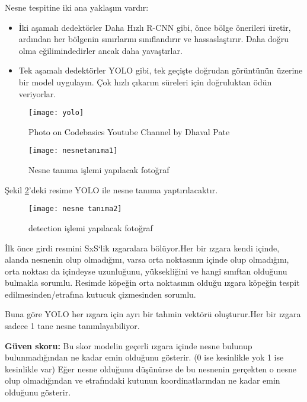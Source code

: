 \documentclass[11pt,a4paper]{report}
\begin{document}
\begin{justify}
   	Nesne tespitine iki ana yaklaşım vardır:
   	\begin{itemize}
   		\item  İki aşamalı dedektörler Daha Hızlı R-CNN gibi, önce bölge önerileri üretir, ardından her bölgenin sınırlarını sınıflandırır ve hassaslaştırır. Daha doğru olma eğilimindedirler ancak daha yavaştırlar.
   		\item  Tek aşamalı dedektörler YOLO gibi, tek geçişte doğrudan görüntünün üzerine bir model uygulayın. Çok hızlı çıkarım süreleri için doğruluktan ödün veriyorlar.
   	\end{itemize}
   	
   	\begin{figure}[!h]
   		\centering
   		\texttt{[image: yolo]}
   		\caption{Photo on Codebasics Youtube Channel by Dhaval Pate}
   		\label{fig:ornek2}
   	\end{figure}
   
   	
   	\begin{figure}[!h]
   		\centering
   		\texttt{[image: nesnetanıma1]}
   		\caption{Nesne tanıma işlemi yapılacak fotoğraf}
   		\label{fig:ornek3}
   	\end{figure}
   	
   	Şekil \ref{fig:ornek3}'deki resime YOLO ile nesne tanıma yaptırılacaktır. 
   	
   	
   	\begin{figure}[!h]
   		\centering
   		\texttt{[image: nesne tanıma2]}
   		\label{ornek4}
   		\caption{detection işlemi yapılacak fotoğraf}
   	\end{figure}
   	\newpage
   	İlk önce girdi resmini SxS‘lik ızgaralara bölüyor.Her bir ızgara kendi içinde, alanda nesnenin olup olmadığını, varsa orta noktasının içinde olup olmadığını, orta noktası da içindeyse uzunluğunu, yüksekliğini ve hangi sınıftan olduğunu bulmakla sorumlu. Resimde köpeğin orta noktasının olduğu ızgara köpeğin tespit edilmesinden/etrafına kutucuk çizmesinden sorumlu.
   	\newline
   	
   	Buna göre YOLO her ızgara için ayrı bir tahmin vektörü oluşturur.Her bir ızgara sadece 1 tane nesne tanımlayabiliyor. \newline
   	
   	\textbf{Güven skoru:} Bu skor modelin geçerli ızgara içinde nesne bulunup bulunmadığından ne kadar emin olduğunu gösterir. (0 ise kesinlikle yok 1 ise kesinlikle var) Eğer nesne olduğunu düşünürse de bu nesnenin gerçekten o nesne olup olmadığından ve etrafındaki kutunun koordinatlarından ne kadar emin olduğunu gösterir.
   	\newline
   	

\end{justify}
\end{document}
